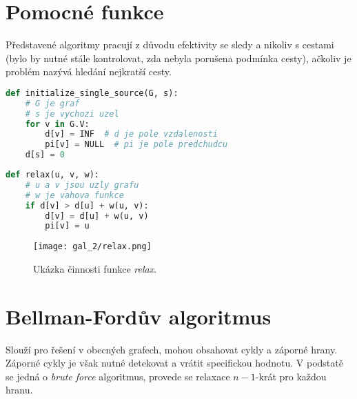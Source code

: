 
\section{Pomocné funkce}

Představené algoritmy pracují z důvodu efektivity se sledy a nikoliv s cestami (bylo by nutné stále kontrolovat, zda nebyla porušena podmínka cesty), ačkoliv je problém nazývá hledání nejkratší cesty.

\bigskip\noindent\begin{minipage}{\linewidth}
\begin{lstlisting}[language=Python, caption={Pomocná inicializační funkce. Složitost je $\Theta(n)$, kde $n$ je počet uzlů.}]
def initialize_single_source(G, s):
    # G je graf
    # s je vychozi uzel
    for v in G.V:
        d[v] = INF  # d je pole vzdalenosti
        pi[v] = NULL  # pi je pole predchudcu
    d[s] = 0
\end{lstlisting}
\end{minipage}

\noindent\begin{minipage}{\linewidth}
\begin{lstlisting}[language=Python, caption={Pomocná funkce \textit{relax}. Složitost je $O(1)$.}]
def relax(u, v, w):
    # u a v jsou uzly grafu
    # w je vahova funkce
    if d[v] > d[u] + w(u, v):
        d[v] = d[u] + w(u, v)
        pi[v] = u
\end{lstlisting}
\end{minipage}

\begin{figure}[H]
    \centering
    \texttt{[image: gal\_2/relax.png]}
    \caption{Ukázka činnosti funkce \textit{relax}.}
\end{figure}


\section{Bellman-Fordův algoritmus}

Slouží pro řešení v obecných grafech, mohou obsahovat cykly a záporné hrany. Záporné cykly je však nutné detekovat a vrátit specifickou hodnotu. V podstatě se jedná o \textit{brute force} algoritmus, provede se relaxace $n-1$-krát pro každou hranu.

